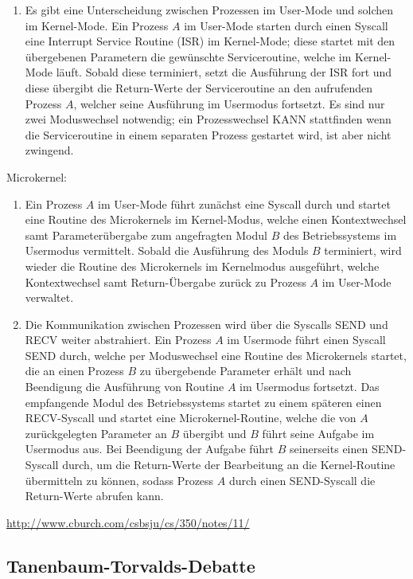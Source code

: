 \documentclass[numbers=noendperiod]{scrartcl}
\begin{document}
\begin{enumerate}[1)]
\begin{enumerate}
			\item Es gibt eine Unterscheidung zwischen Prozessen im User-Mode und solchen im Kernel-Mode. Ein Prozess $A$ im User-Mode starten durch einen Syscall eine Interrupt Service Routine (ISR) im Kernel-Mode; diese startet mit den übergebenen Parametern die gewünschte Serviceroutine, welche im Kernel-Mode läuft. Sobald diese terminiert, setzt die Ausführung der ISR fort und diese übergibt die Return-Werte der Serviceroutine an den aufrufenden Prozess $A$, welcher seine Ausführung im Usermodus fortsetzt. Es sind nur zwei Moduswechsel notwendig; ein Prozesswechsel KANN stattfinden wenn die Serviceroutine in einem separaten Prozess gestartet wird, ist aber nicht zwingend.
		\end{enumerate}
		Microkernel:
		\begin{enumerate}
			\item Ein Prozess $A$ im User-Mode führt zunächst eine Syscall durch und startet eine Routine des Microkernels im Kernel-Modus, welche einen Kontextwechsel samt Parameterübergabe zum angefragten Modul $B$ des Betriebssystems im Usermodus vermittelt. Sobald die Ausführung des Moduls $B$ terminiert, wird wieder die Routine des Microkernels im Kernelmodus ausgeführt, welche Kontextwechsel samt Return-Übergabe zurück zu Prozess $A$ im User-Mode verwaltet.
			
			\item Die Kommunikation zwischen Prozessen wird über die Syscalls SEND und RECV weiter abstrahiert. Ein Prozess $A$ im Usermode führt einen Syscall SEND durch, welche per Moduswechsel eine Routine des Microkernels startet, die an einen Prozess $B$ zu übergebende Parameter erhält und nach Beendigung die Ausführung von Routine $A$ im Usermodus fortsetzt. Das empfangende Modul des Betriebssystems startet zu einem späteren einen RECV-Syscall und startet eine Microkernel-Routine, welche die von $A$ zurückgelegten Parameter an $B$ übergibt und $B$ führt seine Aufgabe im Usermodus aus. Bei Beendigung der Aufgabe führt $B$ seinerseits einen SEND-Syscall durch, um die Return-Werte der Bearbeitung an die Kernel-Routine übermitteln zu können, sodass Prozess $A$ durch einen SEND-Syscall die Return-Werte abrufen kann.
		\end{enumerate}
	
	\url{http://www.cburch.com/csbsju/cs/350/notes/11/}
	\end{enumerate}

\subsection*{Tanenbaum-Torvalds-Debatte}
\end{document}
